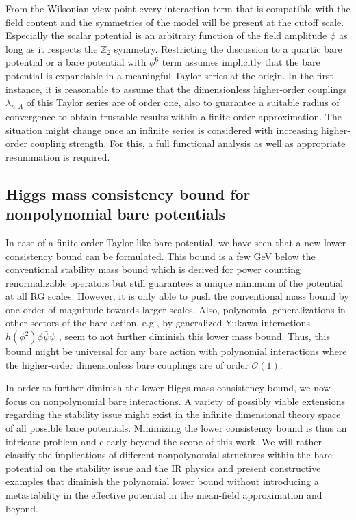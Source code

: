 \documentclass[twocolumn,aps,prd,showpacs,nofootinbib,superscriptaddress,preprintnumbers,floatfix,10pt]{revtex4-1}
\newcommand{\psib}{\bar{\psi}}
\begin{document}
From the Wilsonian view point every interaction term that is compatible with the field content and the symmetries of the model will be present at the cutoff scale. Especially the scalar potential is an arbitrary function of the field amplitude $\phi$ as long as it respects the $\mathbb{Z}_{2}$ symmetry. Restricting the discussion to a quartic bare potential or a bare potential with $\phi^{6}$ term assumes implicitly that the bare potential is expandable in a meaningful Taylor series at the origin. 
In the first instance, it is reasonable to assume that the dimensionless higher-order couplings $\lambda_{n,\Lambda}$ of this Taylor series are of order one, also to guarantee a suitable radius of convergence to obtain trustable results within a finite-order approximation. The situation might change once an infinite series is considered with increasing higher-order coupling strength. For this, a full functional analysis as well as appropriate resummation is required.






\subsection{Higgs mass consistency bound for nonpolynomial bare potentials}
%
In case of a finite-order Taylor-like bare potential, we have seen that a new lower consistency bound can be formulated. This bound is a few GeV below the conventional stability mass bound which is derived for power counting renormalizable operators but still guarantees a unique minimum of the potential at all RG scales. 
However, it is only able to push the conventional mass bound by one order of magnitude towards larger scales.
Also, polynomial generalizations in other sectors of the bare action, e.g., by generalized Yukawa interactions $h(\phi^{2})\phi\psib\psi$ \cite{Jakovac:2015kka,Gies:2017zwf}, seem to not further diminish this lower mass bound. 
Thus, this bound might be universal for any bare action with polynomial interactions where the higher-order dimensionless bare couplings are of order $\mathcal{O}(1)$.


In order to further diminish the lower Higgs mass consistency bound, we now focus on nonpolynomial bare interactions. 
A variety of possibly viable extensions regarding the stability issue might exist in the infinite dimensional theory space of all possible bare potentials. 
Minimizing the lower consistency bound is thus an intricate problem and clearly beyond the scope of this work. 
We will rather classify the implications of different nonpolynomial structures within the bare potential on the stability issue and the IR physics and present constructive examples that diminish the polynomial lower bound without introducing a metastability in the effective potential in the mean-field approximation and beyond. 
\end{document}
